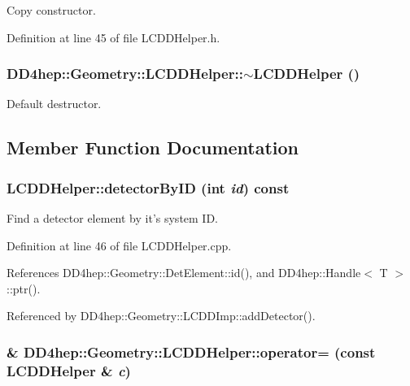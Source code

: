 Copy constructor. 

Definition at line 45 of file LCDDHelper.h.\hypertarget{class_d_d4hep_1_1_geometry_1_1_l_c_d_d_helper_a11685292c888b6c1670c711912eb5563}{
\subsubsection[{$\sim$LCDDHelper}]{\setlength{\rightskip}{0pt plus 5cm}DD4hep::Geometry::LCDDHelper::$\sim$LCDDHelper ()}}
\label{class_d_d4hep_1_1_geometry_1_1_l_c_d_d_helper_a11685292c888b6c1670c711912eb5563}


Default destructor. 

\subsection{Member Function Documentation}
\hypertarget{class_d_d4hep_1_1_geometry_1_1_l_c_d_d_helper_a254105cb4c608b84d47b5dd0eb28f0f2}{
\subsubsection[{detectorByID}]{ LCDDHelper::detectorByID (int {\em id}) const}}
\label{class_d_d4hep_1_1_geometry_1_1_l_c_d_d_helper_a254105cb4c608b84d47b5dd0eb28f0f2}


Find a detector element by it's system ID. 

Definition at line 46 of file LCDDHelper.cpp.

References DD4hep::Geometry::DetElement::id(), and DD4hep::Handle$<$ T $>$::ptr().

Referenced by DD4hep::Geometry::LCDDImp::addDetector().\hypertarget{class_d_d4hep_1_1_geometry_1_1_l_c_d_d_helper_a98179f348166edb136409825f0e74ef7}{
\subsubsection[{operator=}]{\& DD4hep::Geometry::LCDDHelper::operator= (const {\bf LCDDHelper} \& {\em c})}}
\label{class_d_d4hep_1_1_geometry_1_1_l_c_d_d_helper_a98179f348166edb136409825f0e74ef7}



